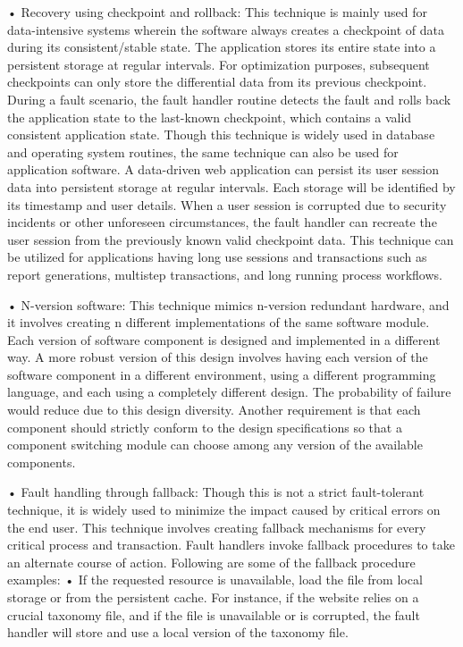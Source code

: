 • Recovery using checkpoint and rollback: This technique is mainly used for data-intensive systems wherein the software always creates a checkpoint of data during its consistent/stable state. The application stores its entire state into a persistent storage at regular intervals. For optimization purposes, subsequent checkpoints can only store the differential data from its previous checkpoint. During a fault scenario, the fault handler routine detects the fault and rolls back the application state to the last-known checkpoint, which contains a valid consistent application state. Though this technique is widely used in database and operating system routines, the same technique can also be used for application software. A data-driven web application can persist its user session data into persistent storage at regular intervals. Each storage will be identified by its timestamp and user details. When a user session is corrupted due to security incidents or other unforeseen circumstances, the fault handler can recreate the user session from the previously known valid checkpoint data. This technique can be utilized for applications having long use sessions and transactions such as report generations, multistep transactions, and long running process workflows.

• N-version software: This technique mimics n-version redundant hardware, and it involves creating n different implementations of the same software module. Each version of software component is designed and implemented in a different way. A more robust version of this design involves having each version of the software component in a different environment, using a different programming language, and each using a completely different design. The probability of failure would reduce due to this design diversity. Another requirement is that each component should strictly conform to the design specifications so that a component switching module can choose among any version of the available components.

• Fault handling through fallback: Though this is not a strict fault-tolerant technique, it is widely used to minimize the impact caused by critical errors on the end user. This technique involves creating fallback mechanisms for every critical process and transaction. Fault handlers invoke fallback procedures to take an alternate course of action. Following are some of the fallback procedure examples:
• If the requested resource is unavailable, load the file from local storage or from the persistent cache. For instance, if the website relies on a crucial taxonomy file, and if the file is unavailable or is corrupted, the fault handler will store and use a local version of the taxonomy file.

